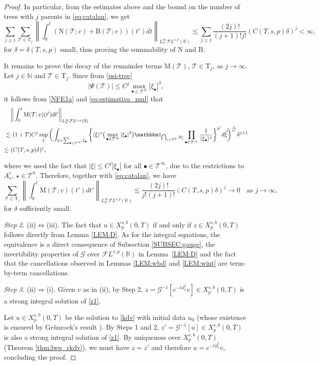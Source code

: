 \documentclass[a4paper,
11pt,  reqno]{amsart}
\newcommand{\jap}[1]{\langle #1 \rangle}
\newcommand{\5}{\textup{V}}
\newcommand{\noi}{\noindent}
\newcommand{\FL}{\mathcal{F} L}
\newcommand{\ind}{\mathbbm 1}
\newcommand{\dl}{\delta}
\newcommand{\dx}{\partial_x}
\theoremstyle{remark}
\newcommand{\R}{\mathbb{R}}
\newcommand{\bul}{\bullet}
\newcommand{\TT}{\mathcal{T}}
\newcommand{\Tr}{\mathrm{T}}
\newcommand{\N}{\mathbb{N}}
\newcommand{\Gc}{\mathcal{G}}
\numberwithin{equation}{section}
\numberwithin{theorem}{section}
\newcommand{\MM}{\mathrm{M}}
\newcommand{\NN}{\mathrm{N}}
\newcommand{\BB}{\mathrm{B}}
\begin{document}
\begin{proof}
    \noi
In particular, from the estimates above and the bound on the number of trees with $j$ parents in \eqref{eq:catalan}, we get
\begin{equation}
    \sum_{j\ge 1}\sum_{\TT\in\Tr_j}\left\|\int_0^t(\NN(\TT;v)+\BB(\TT;v))(t')dt\right\|_{L^\infty_T \mathcal{F}L^{s,p}(\R)} \lesssim \sum_{j\ge 1}\frac{(2j)!}{(j+1)! j!}(C(T,s,p)\delta)^j <\infty,
\end{equation}
for $\delta=\delta(T,s,p)$ small, thus proving the summability of $\NN$ and $\BB$. 

It remains to prove the decay of the remainder terms $\MM(\TT)$, $\TT\in \Tr_j$, as $j\to \infty$. Let $j\in\N$ and $\TT\in\Tr_j$. Since from \eqref{psi-tree}
$$
|\Psi(\TT)|\le C^j\max_{\bul\in \TT^\infty} |\xi_\bul|^3,
$$
it follows from \eqref{NFE1a} and \eqref{eq:estimativa_mul} that
\begin{align}
    &\bigg\|\int_0^t\MM(\TT;v)(t')dt'\bigg\|_{{L^\infty_T }\FL^{s,p}(\R)} \\\lesssim &\ (1+T)C^j\sup_\xi \bigg( 
    \int_{\xi=\sum_{\bul\in\TT^\infty}\xi_\bul} \bigg\{\jap{\xi}^{s}\big(\max_{\bul\in\TT^\infty}|\xi_\bul|^3\big)
    \ind_{\bigcap_{\star\in\TT^0} A^c_\star}
    \prod_{{\bul\in \TT^\infty}} \frac{1}{\jap{\xi_\bul}^{s}}\bigg\}^{p'} d\vec{\xi} \bigg)^{\frac{1}{p'}}\delta^{j+1}\\\lesssim\ &(C(T,s,p)\delta)^j,
\end{align}



\noi
where we used the fact that $|\xi|\le C^j |\xi_{\bul}|$ for all $\bul\in\TT^\infty$, due to the restrictions to $A^c_\star$, $\star\in \TT^0$.
Therefore, together with \eqref{eq:catalan}, we have
$$
\sum_{\TT\in \Tr_j}\left\|\int_0^t\MM(\TT;v)(t')dt'\right\|_{{L^\infty_T}\FL^{s,p}(\R)} \lesssim \frac{(2j)!}{j!(j+1)!}(C(T,s,p)\delta)^j \to 0\quad \mbox{as }j\to\infty, 
$$
for $\dl$ sufficiently small.


\smallskip
\noi\textit{Step 2.} (ii)$\Leftrightarrow$(iii). The fact that $u\in X^{s,b}_p(0,T)$ if and only if $z\in X^{s,b}_p(0,T)$ follows directly from Lemma \ref{LEM:D}. As for the integral equations, the equivalence is a direct consequence of Subsection \ref{SUBSEC:gauge}, the invertibility properties of $\Gc$ over $\FL^{s,p}(\R)$ in {Lemma~\ref{LEM:D}} and the fact that the cancellations observed in Lemmas \ref{LEM:wbd} and \ref{LEM:wint} are term-by-term cancellations.


\smallskip
\noi\textit{Step 3.} (ii)$\Rightarrow$(i). Given $v$ as in (ii), by Step 2, $z=\mathcal{G}^{-1}[e^{-t\partial_x^3}v]\in X^{s,b}_p(0,T)$
is a strong integral solution of \eqref{z1}.


Let $u\in X^{s,b}_p(0,T)$ be the solution to \eqref{kdv} with initial data $u_0$ (whose existence is ensured by Grünrock's result \cite{Grunrock_ldv_hier}). By Steps 1 and 2, $z'=\Gc^{-1}[u]\in X^{s,b}_p(0,T)$ is also a strong integral solution of \eqref{z1}. By uniqueness over $X^{s,b}_p(0,T)$ (Theorem \ref{thm:lwp_rkdv}), we must have $z=z'$ and therefore $u=e^{-t\dx^3}v$, concluding the proof.
\qedhere




\end{proof}
\end{document}
